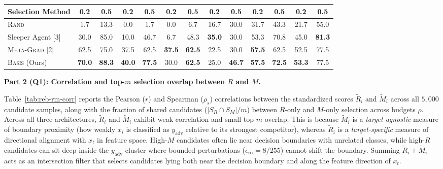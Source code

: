 \begin{table}[h!]
{\begin{tabular}{@{}l cc cc cc cc cc cc@{}}
\textbf{Selection Method} & 0.2 & 0.5 & 0.2 & 0.5 & 0.2 & 0.5 & 0.2 & 0.5 & 0.2 & 0.5 & 0.2 & 0.5 \\
\midrule
\textsc{Rand}                                               & {1.7}  & {13.3} & {0.0}  & {1.7}  & {0.0}  & {6.7}  & {16.7} & {30.0} & {31.7} & {43.3} & {21.7} & {55.0} \\
Sleeper Agent [3]                                        & 30.0       & 85.0       & {10.0} & {46.7} & {6.7}  & {48.3} & \textbf{35.0} & 30.0       & {53.3} & {70.8} & {45.0} & {\textbf{81.3}} \\
\textsc{Meta-Grad} [2]                                    & 62.5       & 75.0 & 37.5       & 62.5       & \textbf{37.5} & \textbf{62.5} & 22.5       & 30.0       & \textbf{57.5} & 62.5 & 52.5       & 77.5       \\
\midrule
\textsc{Basis} (Ours)                                       & {\textbf{70.0}} & {\textbf{88.3}} & {\textbf{40.0}} & {\textbf{77.5}} & {30.0} & {\textbf{62.5}} & {25.0} & {\textbf{46.7}} & {\textbf{57.5}} & {\textbf{72.5}} & {\textbf{53.3}} & {77.5} \\
\bottomrule
\end{tabular}%
}
\end{table}




\bigskip
\noindent\textbf{Part 2 (Q1): Correlation and top-$m$ selection overlap between $R$ and $M$.}

Table~\ref{tab:reb-rm-corr} reports the Pearson ($r$) and Spearman ($\rho_s$) correlations between the standardized scores $\tilde{R}_i$ and $\tilde{M}_i$ across all $5{,}000$ candidate samples, along with the fraction of shared candidates ($|S_R \cap S_M|/m$) between $R$-only and $M$-only selection across budgets $\rho$. Across all three architectures, $\tilde{R}_i$ and $\tilde{M}_i$ exhibit weak correlation and small top-$m$ overlap. This is because $\tilde{M}_i$ is a \emph{target-agnostic} measure of boundary proximity (how weakly $x_i$ is classified as $y_{\text{adv}}$ relative to its strongest competitor), whereas $\tilde{R}_i$ is a \emph{target-specific} measure of directional alignment with $x_t$ in feature space. High-$M$ candidates often lie near decision boundaries with unrelated classes, while high-$R$ candidates can sit deep inside the $y_{\text{adv}}$ cluster where bounded perturbations ($\epsilon_\infty = 8/255$) cannot shift the boundary. Summing $\tilde{R}_i + \tilde{M}_i$ acts as an intersection filter that selects candidates lying both near the decision boundary and along the feature direction of $x_t$.

